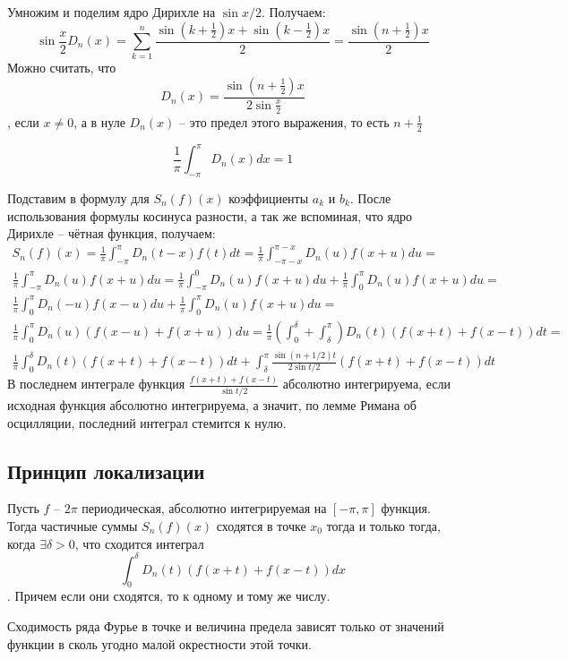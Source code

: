 \documentclass[document.tex]{subfiles}
\begin{document}
\begin{remark}
	Умножим и поделим ядро Дирихле на $\sin x/2$. Получаем:
	$$\sin \frac{x}{2} D_n(x) = \sum_{k = 1}^n \frac{\sin(k + \frac{1}{2})x + \sin (k - \frac{1}{2})x}{2}
	= \frac{\sin(n+\frac{1}{2})x}{2}$$
	Можно считать, что $$D_n(x) = \frac{\sin(n+\frac{1}{2})x}{2 \sin \frac{x}{2}}$$, если $x \neq 0$, а в нуле $D_n(x)$
    -- это предел этого выражения, то есть $n + \frac{1}{2}$
\end{remark}

\begin{remark}
	$$\frac{1}{\pi} \int_{-\pi}^{\pi} D_n(x) dx = 1$$
\end{remark}

\begin{remark}
	Подставим в формулу для $S_n(f)(x)$ коэффициенты $a_k$ и $b_k$. После использования формулы косинуса разности, а так
    же вспоминая, что ядро Дирихле -- чётная функция, получаем:
    \begin{multline*} 
        S_n(f)(x) = \frac{1}{\pi} \int_{-\pi}^{\pi} D_n(t - x) f(t) dt = \frac{1}{\pi} \int_{-\pi - x}^{\pi - x}D_n(u) f(x + u)
        du = \\
        \frac{1}{\pi}\int_{-\pi}^{\pi}D_n(u) f(x + u) du = 
        \frac{1}{\pi} \int_{-\pi}^{0}D_n(u) f(x + u) du + \frac{1}{\pi} \int_{0}^{\pi}D_n(u) f(x + u) du = \\
        \frac{1}{\pi} \int_{0}^{\pi}D_n(-u) f(x - u) du + \frac{1}{\pi} \int_{0}^{\pi}D_n(u) f(x + u) du = \\
        \frac{1}{\pi} \int_{0}^{\pi}D_n(u) (f(x - u) + f(x + u)) du = 
        \frac{1}{\pi} \left(\int_0^{\delta} + \int_{\delta}^{\pi} \right) D_n(t) (f(x+t) + f(x-t))dt = \\
        \frac{1}{\pi} \int_{0}^{\delta}D_n(t) (f(x+t) + f(x - t)) dt + \int_{\delta}^{\pi}\frac{\sin (n + 1/2)t}{2\sin
        t/2} (f(x+t) + f(x-t))dt
    \end{multline*}
    В последнем интеграле функция $\frac{f(x + t) + f(x - t)}{\sin t/2}$ абсолютно интегрируема, если исходная функция
    абсолютно интегрируема, а значит, по лемме
    Римана об осцилляции, последний интеграл стемится к нулю.
\end{remark}

\subsection{Принцип локализации}

\begin{theorem}
	Пусть $f$ -- $2\pi$ периодическая, абсолютно интегрируемая на $[-\pi, \pi]$ функция. Тогда частичные суммы $S_n(f)(x)$ сходятся в точке
	$x_0$ тогда и только тогда, когда $\exists \delta > 0$, что сходится интеграл $$\int_0^{\delta} D_n(t) (f(x+t) + f(x-t))dx$$. Причем если они сходятся, то к одному
	и тому же числу.
\end{theorem}

\begin{corollary}
	Сходимость ряда Фурье в точке и величина предела зависят только от значений функции в сколь угодно малой окрестности этой точки.
\end{corollary}
\end{document}
